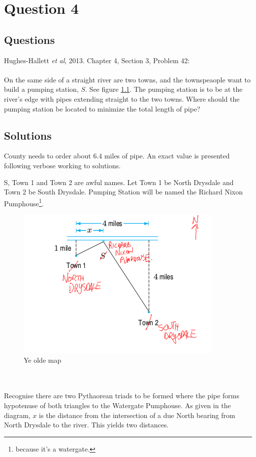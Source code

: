 \chapter{Question 4}
\section{Questions}
Hughes-Hallett \emph{et al}, 2013. Chapter 4, Section 3, Problem 42: \\
\\
\noindent On the same side of a straight river are two towns, and the
townspeaople want to build a pumping station, $S$. See figure \ref{fig:q4_map}.
The pumping station is to be at the river's edge with pipes extending straight
to the two towns. Where should the pumping station be located to minimize the
total length of pipe?

\section{Solutions}
County needs to order about 6.4 miles of pipe. An exact value is presented
following verbose working to solutions.

\noindent S, Town 1 and Town 2 are awful names. Let Town 1 be North Drysdale
and Town 2 be South Drysdale. Pumping Station will be named the Richard Nixon
Pumphouse\footnote{because it's a watergate.}.
\newpage
\begin{figure}[!t]
  \includegraphics[width=\linewidth]{solutions/q4/map.png}
  \caption{Ye olde map}
  \label{fig:q4_map}
\end{figure} \\
\\
\noindent Recognise there are two Pythaorean triads to be formed where the pipe
forms hypotenuse of both triangles to the Watergate Pumphouse. As given in the
diagram, $x$ is the distance from the intersection of a due North bearing from
North Drysdale to the river. This yields two distances.

